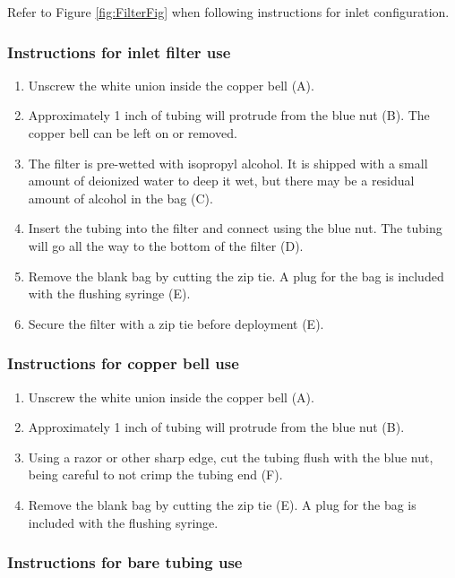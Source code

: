 Refer to Figure \ref{fig:FilterFig}  when following instructions for \instType{} inlet configuration.


\subsubsection{Instructions for inlet filter use}

\begin{enumerate}
\item
Unscrew the white union inside the copper bell (A).
\item
Approximately 1 inch of tubing will protrude from the blue nut (B).  The copper bell can be left on or removed.
\item 
The filter is pre-wetted with isopropyl alcohol.  It is shipped with a small amount of deionized water to deep it wet, but there may be a residual amount of alcohol in the bag (C).
\item
Insert the tubing into the filter and connect using the blue nut.  The tubing will go all the way to the bottom of the filter (D).
\item
Remove the blank bag by cutting the zip tie.  A plug for the bag is included with the flushing syringe (E).
\item
Secure the filter with a zip tie before deployment (E).
\end{enumerate}


\subsubsection{Instructions for copper bell use}

\begin{enumerate}
\item
Unscrew the white union inside the copper bell (A).
\item
Approximately 1 inch of tubing will protrude from the blue nut (B).
\item
Using a razor or other sharp edge, cut the tubing flush with the blue nut, being careful to not crimp the tubing end (F).
\item
Remove the blank bag by cutting the zip tie (E).  A plug for the bag is included with the flushing syringe.
\end{enumerate}


\subsubsection{Instructions for bare tubing use}

